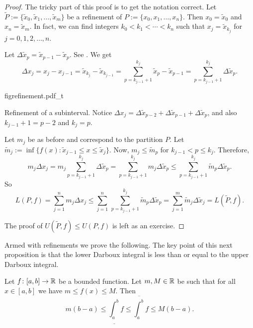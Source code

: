 \begin{proof}
The tricky part of this proof is to get the notation correct.
Let $\widetilde{P} := \{ \widetilde{x}_0, \widetilde{x}_1, \ldots,
\widetilde{x}_m \}$ be
a refinement of 
$P := \{ x_0, x_1, \ldots, x_n \}$.  Then
$x_0 = \widetilde{x}_0$ and 
$x_n = \widetilde{x}_m$.  In fact, we can find integers
$k_0 < k_1 < \cdots < k_n$ such that $x_j = \widetilde{x}_{k_j}$ for
$j=0,1,2,\ldots,n$.

Let $\Delta \widetilde{x}_p = \widetilde{x}_{p-1} - \widetilde{x}_p$.
See .
We get 
\begin{equation*}
\Delta x_j
=
x_j - x_{j-1} =
\widetilde{x}_{k_j} - \widetilde{x}_{k_{j-1}} =
\sum_{p=k_{j-1}+1}^{k_j} 
\widetilde{x}_{p} - \widetilde{x}_{p-1}
=
\sum_{p=k_{j-1}+1}^{k_j} \Delta \widetilde{x}_p .
\end{equation*}
\begin{myfigureht}
{figrefinement.pdf_t}
\caption{Refinement of a subinterval.  Notice $\Delta x_j =
\Delta \widetilde{x}_{p-2} +
\Delta \widetilde{x}_{p-1} +
\Delta \widetilde{x}_{p}$,
and also
$k_{j-1}+1 = p-2$ and
$k_{j} = p$.\label{fig:refinement}}
\end{myfigureht}

Let $m_j$ be as before and correspond to the partition $P$.
Let $\widetilde{m}_j := \inf \{ f(x) : \widetilde{x}_{j-1} \leq x \leq
\widetilde{x}_j \}$.
Now, $m_j \leq \widetilde{m}_p$ for $k_{j-1} < p \leq k_j$.  Therefore,
\begin{equation*}
m_j \Delta x_j
=
m_j \sum_{p=k_{j-1}+1}^{k_j} \Delta \widetilde{x}_p
=
\sum_{p=k_{j-1}+1}^{k_j} m_j \Delta \widetilde{x}_p
\leq
\sum_{p=k_{j-1}+1}^{k_j} \widetilde{m}_p \Delta \widetilde{x}_p .
\end{equation*}
So
\begin{equation*}
L(P,f) =
\sum_{j=1}^n m_j \Delta x_j
\leq
\sum_{j=1}^n \,
\sum_{p=k_{j-1}+1}^{k_j} \widetilde{m}_p \Delta \widetilde{x}_p
=
\sum_{j=1}^m
\widetilde{m}_j \Delta \widetilde{x}_j = L(\widetilde{P},f).
\end{equation*}

The proof of $U(\widetilde{P},f) \leq U(P,f)$ is left as an exercise.
\end{proof}

Armed with refinements we prove the following.
The key point of this next proposition is that
the lower Darboux integral is less than or equal to the upper Darboux
integral.

\begin{prop} \label{intulbound:prop}
Let $f \colon [a,b] \to {\mathbb{R}}$ be a bounded function.  Let $m, M \in {\mathbb{R}}$ be 
such that for all $x \in [a,b]$ we have $m \leq f(x) \leq M$.  Then
\begin{equation}
\label{intulbound:eq}
m(b-a) \leq
\underline{\int_a^b} f \leq \overline{\int_a^b} f
\leq M(b-a) .
\end{equation}
\end{prop}

